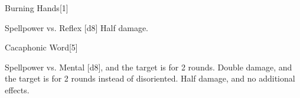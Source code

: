 \begin{spellsection}{Burning Hands}[1]
    \begin{spellheader}
    \end{spellheader}
    \begin{spellcontent}
        \begin{spelltargetinginfo}
        \end{spelltargetinginfo}
        \begin{spelleffects}
            \begin{spellattack}{Spellpower vs. Reflex}
                \spellsuccess {}[d8]
                \spellfailure Half damage.
            \end{spellattack}
        \end{spelleffects}
    \end{spellcontent}
    \begin{spellfooter}
        \miscastexplode
    \end{spellfooter}
    \begin{spellaugments}
    \end{spellaugments}
\end{spellsection}


\begin{spellsection}{Cacaphonic Word}[5]
    \begin{spellheader}
    \end{spellheader}
    \begin{spellcontent}
        \begin{spelltargetinginfo}
        \end{spelltargetinginfo}
        \begin{spelleffects}
            \begin{spellattack}{Spellpower vs. Mental}
                \spellsuccess {}[d8], and the target is \disoriented for 2 rounds.
                \spellcritical Double damage, and the target is \confused for 2 rounds instead of disoriented.
                \spellfailure Half damage, and no additional effects.
            \end{spellattack}
        \end{spelleffects}
    \end{spellcontent}
    \begin{spellfooter}
        \miscastexplode
    \end{spellfooter}
\end{spellsection}

